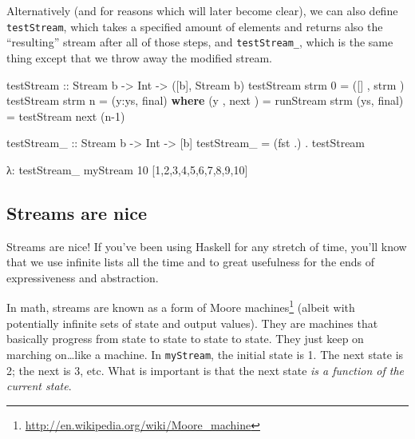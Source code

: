 \documentclass[]{article}
\newenvironment{Shaded}{}{}
\newcommand{\KeywordTok}[1]{\textcolor[rgb]{0.00,0.44,0.13}{\textbf{{#1}}}}
\newcommand{\DataTypeTok}[1]{\textcolor[rgb]{0.56,0.13,0.00}{{#1}}}
\newcommand{\DecValTok}[1]{\textcolor[rgb]{0.25,0.63,0.44}{{#1}}}
\newcommand{\OtherTok}[1]{\textcolor[rgb]{0.00,0.44,0.13}{{#1}}}
\newcommand{\FunctionTok}[1]{\textcolor[rgb]{0.02,0.16,0.49}{{#1}}}
\newcommand{\NormalTok}[1]{{#1}}
\renewcommand{\href}[2]{#2\footnote{\url{#1}}}
\begin{document}
Alternatively (and for reasons which will later become clear), we can also define
\texttt{testStream}, which takes a specified amount of elements and returns also the ``resulting''
stream after all of those steps, and \texttt{testStream\_}, which is the same thing except that we
throw away the modified stream.

\begin{Shaded}
\begin{Highlighting}[]
\OtherTok{testStream ::} \DataTypeTok{Stream} \NormalTok{b }\OtherTok{->} \DataTypeTok{Int} \OtherTok{->} \NormalTok{([b], }\DataTypeTok{Stream} \NormalTok{b)}
\NormalTok{testStream strm }\DecValTok{0} \FunctionTok{=} \NormalTok{([]  , strm )}
\NormalTok{testStream strm n }\FunctionTok{=} \NormalTok{(y}\FunctionTok{:}\NormalTok{ys, final)}
  \KeywordTok{where}
    \NormalTok{(y , next )   }\FunctionTok{=} \NormalTok{runStream  strm}
    \NormalTok{(ys, final)   }\FunctionTok{=} \NormalTok{testStream next (n}\FunctionTok{-}\DecValTok{1}\NormalTok{)}

\OtherTok{testStream_ ::} \DataTypeTok{Stream} \NormalTok{b }\OtherTok{->} \DataTypeTok{Int} \OtherTok{->} \NormalTok{[b]}
\NormalTok{testStream_ }\FunctionTok{=} \NormalTok{(fst }\FunctionTok{.}\NormalTok{) }\FunctionTok{.} \NormalTok{testStream}
\end{Highlighting}
\end{Shaded}

\begin{Shaded}
\begin{Highlighting}[]
\NormalTok{λ}\FunctionTok{:} \NormalTok{testStream_ myStream }\DecValTok{10}
\NormalTok{[}\DecValTok{1}\NormalTok{,}\DecValTok{2}\NormalTok{,}\DecValTok{3}\NormalTok{,}\DecValTok{4}\NormalTok{,}\DecValTok{5}\NormalTok{,}\DecValTok{6}\NormalTok{,}\DecValTok{7}\NormalTok{,}\DecValTok{8}\NormalTok{,}\DecValTok{9}\NormalTok{,}\DecValTok{10}\NormalTok{]}
\end{Highlighting}
\end{Shaded}

\subsection{Streams are nice}\label{streams-are-nice}

Streams are nice! If you've been using Haskell for any stretch of time, you'll know that we use
infinite lists all the time and to great usefulness for the ends of expressiveness and abstraction.

In math, streams are known as a form of \href{http://en.wikipedia.org/wiki/Moore_machine}{Moore
machines} (albeit with potentially infinite sets of state and output values). They are machines that
basically progress from state to state to state to state. They just keep on marching on\ldots{}like
a machine. In \texttt{myStream}, the initial state is 1. The next state is 2; the next is 3, etc.
What is important is that the next state \emph{is a function of the current state}.
\end{document}
